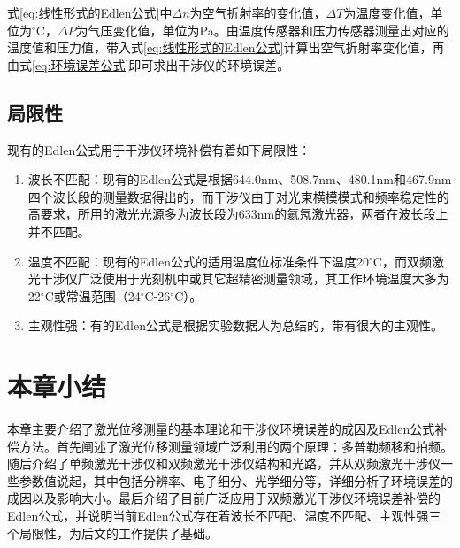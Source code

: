 式\eqref{eq:线性形式的Edlen公式}中\(\Delta n\)为空气折射率的变化值，\(\Delta T\)为温度变化值，单位为$^{\circ} \mathrm{C}$，\(\Delta P\)为气压变化值，单位为Pa。由温度传感器和压力传感器测量出对应的温度值和压力值，带入式\eqref{eq:线性形式的Edlen公式}计算出空气折射率变化值，再由式\eqref{eq:环境误差公式}即可求出干涉仪的环境误差。
\subsection{局限性}
现有的Edlen公式用于干涉仪环境补偿有着如下局限性：
\begin{enumerate}
  \item 波长不匹配：现有的Edlen公式是根据644.0nm、508.7nm、480.1nm和467.9nm四个波长段的测量数据得出的\cite{2020Effect}，而干涉仪由于对光束横模模式和频率稳定性的高要求，所用的激光光源多为波长段为633nm的氦氖激光器，两者在波长段上并不匹配。
  \item 温度不匹配：现有的Edlen公式的适用温度位标准条件下温度20$^{\circ} \mathrm{C}$\cite{2020Effect}，而双频激光干涉仪广泛使用于光刻机中或其它超精密测量领域，其工作环境温度大多为22$^{\circ} \mathrm{C}$或常温范围（24$^{\circ} \mathrm{C}$-26$^{\circ} \mathrm{C}$）。
  \item 主观性强：有的Edlen公式是根据实验数据人为总结的，带有很大的主观性。
\end{enumerate}


\section{本章小结}
本章主要介绍了激光位移测量的基本理论和干涉仪环境误差的成因及Edlen公式补偿方法。首先阐述了激光位移测量领域广泛利用的两个原理：多普勒频移和拍频。随后介绍了单频激光干涉仪和双频激光干涉仪结构和光路，并从双频激光干涉仪一些参数值说起，其中包括分辨率、电子细分、光学细分等，详细分析了环境误差的成因以及影响大小。最后介绍了目前广泛应用于双频激光干涉仪环境误差补偿的Edlen公式，并说明当前Edlen公式存在着波长不匹配、温度不匹配、主观性强三个局限性，为后文的工作提供了基础。
